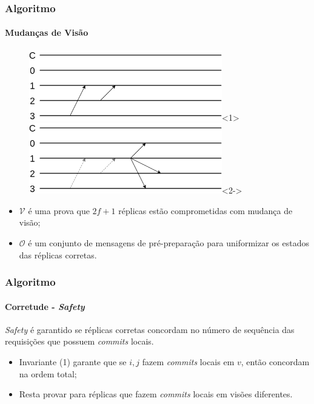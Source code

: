 \documentclass{beamer}
\begin{document}
\begin{frame}
  \frametitle{Algoritmo}
  \framesubtitle{Mudanças de Visão}

  \begin{figure}
    \includegraphics[width=0.75\textwidth]{images/view-change01}<1>
    \includegraphics[width=0.75\textwidth]{images/view-change02}<2->
  \end{figure}
  \pause
  \begin{itemize}
    \item
      $\mathcal{V}$ é uma prova que $2f + 1$ réplicas estão comprometidas com mudança de visão;

      \pause
    \item
      $\mathcal{O}$ é um conjunto de mensagens de pré-preparação para uniformizar os estados das réplicas corretas.
  \end{itemize}
\end{frame}

\begin{frame}
  \frametitle{Algoritmo}
  \framesubtitle{Corretude - \textit{Safety}}

  \textit{Safety} é garantido se réplicas corretas concordam no número de sequência das requisições que possuem \textit{commits} locais.
  \begin{itemize}
    \item
      Invariante (1) garante que se $i, j$ fazem \textit{commits} locais em $v$, então concordam na ordem total;

      \pause
    \item
      Resta provar para réplicas que fazem \textit{commits} locais em visões diferentes.
  \end{itemize}
\end{frame}
\end{document}
